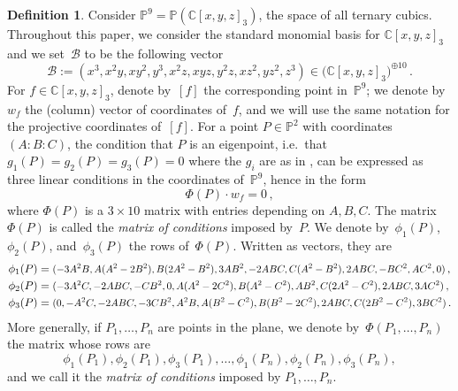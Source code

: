 \documentclass[a4paper, 11pt, reqno]{amsart}
\theoremstyle{plain}
\theoremstyle{definition}
\newtheorem{definition}[lemma]{Definition}
\newcommand{\C}{\mathbb{C}}
\newcommand{\p}{\mathbb{P}}
\newcommand\scalemath[2]{\scalebox{#1}{\mbox{\ensuremath{\displaystyle #2}}}}
\begin{document}
\begin{definition}
\label{definition:matrix_conditions}
Consider $\p^9 = \p(\C[x,y,z]_3)$, the space of all ternary cubics.
Throughout this paper, we consider the standard monomial basis for $\C[x,y,z]_3$ and we set~$\mathcal{B}$ to be the following vector
%
\begin{equation}
\label{eq:vector_basis}
  \mathcal{B} := (x^3, x^2 y, x y^2, y^3, x^2 z, x y z, y^2 z, x z^2, y z^2, z^3)
  \in \bigl( \C[x,y,z]_3 \bigr)^{\oplus 10} \,.
\end{equation}
For $f \in \C[x,y,z]_3$, denote by~$[f]$ the corresponding point in~$\p^9$; we denote by~$w_f$ the (column) vector of coordinates of~$f$, and we will use the same notation for the projective coordinates of~$[f]$.
For a point $P \in \p^2$ with coordinates $(A: B: C)$, the condition that $P$ is an eigenpoint, i.e.\ that $g_1(P) = g_2(P) = g_3(P) = 0$ where the $g_i$ are as in , can be expressed as three linear conditions in the coordinates of~$\p^9$,
hence
in the form
%
\[
  \Phi(P) \cdot w_f = 0 \,,
\]
%
where $\Phi(P)$ is a $3 \times 10$ matrix with entries depending on $A, B, C$.
The matrix $\Phi(P)$ is called the \emph{matrix of conditions} imposed by~$P$.
We denote by~$\phi_1(P)$, $\phi_2(P)$, and~$\phi_3(P)$ the rows of~$\Phi(P)$.
Written as vectors, they are
%
\begin{equation}
\label{equation:matrix_conditions_rows}
  \begin{aligned}
    \phi_1(P) &=
    \scalemath{0.9}{
    (-3A^2B, A(A^2 - 2B^2), B(2A^2 - B^2), 3AB^2,
     -2ABC, C(A^2 - B^2), 2 ABC,
     -B C^2, A C^2, 0)} \,, \\
    \phi_2(P) &= 
    \scalemath{0.9}{
    (-3A^2 C,
     -2ABC,
     -CB^2,
     0,
     A(A^2-2C^2),
     B(A^2 - C^2),
     AB^2,
     C(2A^2-C^2),
     2ABC,
     3AC^2)} \,,\\
    \phi_3(P) &=
    \scalemath{0.9}{
    (0,
     -A^2C,
     -2ABC,
     -3CB^2,
     A^2 B,
     A(B^2 - C^2),
     B(B^2-2C^2),
     2ABC,
     C(2B^2-C^2),
     3BC^2)} \,.
  \end{aligned}
\end{equation}
%
More generally, if $P_1, \dotsc, P_n$ are points in the plane, we denote by~$\Phi(P_1, \dotsc, P_n)$ the matrix whose rows are
%
\[
  \phi_1(P_1), \phi_2(P_1), \phi_3(P_1),
  \dotsc, 
  \phi_1(P_n), \phi_2(P_n), \phi_3(P_n),
\]
%
and we call it the
\emph{matrix of conditions} imposed by $P_1, \dotsc, P_n$.
\end{definition}
\end{document}
